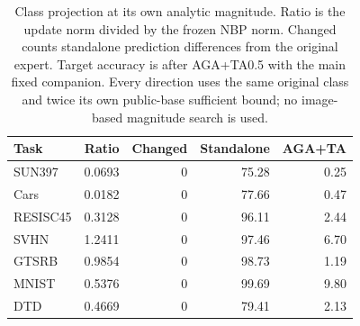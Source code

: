 \begin{table}[!htbp]
\centering
\small
\setlength{\tabcolsep}{4pt}
\caption{Class projection at its own analytic magnitude. Ratio is the update norm divided by the frozen NBP norm. Changed counts standalone prediction differences from the original expert. Target accuracy is after AGA+TA0.5 with the main fixed companion. Every direction uses the same original class and twice its own public-base sufficient bound; no image-based magnitude search is used.}
\label{tab:projection-bound}
\begin{tabular}{lrrrr}
\toprule
Task & Ratio & Changed & Standalone & AGA+TA \\
\midrule
SUN397 & 0.0693 & 0 & 75.28 & 0.25 \\
Cars & 0.0182 & 0 & 77.66 & 0.47 \\
RESISC45 & 0.3128 & 0 & 96.11 & 2.44 \\
SVHN & 1.2411 & 0 & 97.46 & 6.70 \\
GTSRB & 0.9854 & 0 & 98.73 & 1.19 \\
MNIST & 0.5376 & 0 & 99.69 & 9.80 \\
DTD & 0.4669 & 0 & 79.41 & 2.13 \\
\bottomrule
\end{tabular}
\end{table}
